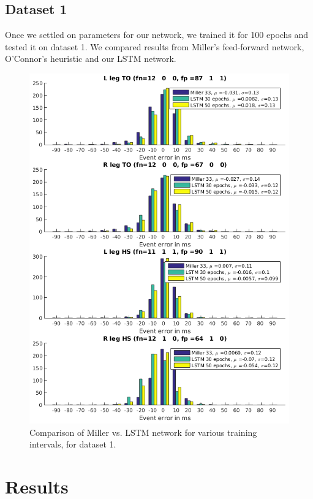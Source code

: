 \documentclass{acm_proc_article-sp}
\begin{document}
\subsection{Dataset 1}
Once we settled on parameters for our network, we trained it for 100 epochs and tested it on dataset 1. We compared results from Miller's feed-forward network, O'Connor's heuristic and our LSTM network. 

\begin{figure}
 \centering
 \includegraphics[scale=.3]{./figures/Test1_1Train1_2Compare.png}
 \caption{Comparison of Miller vs. LSTM network for various training intervals, for dataset 1.}
 \label{fig:halfAndHalfTrials}
\end{figure}

\section{Results}
\label{sec:Results}
\end{document}

